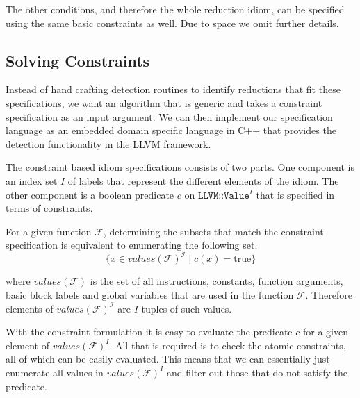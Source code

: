 The other conditions, and therefore the whole reduction idiom, can be specified using the same basic constraints as well.
Due to space we omit further details.


\subsection{Solving Constraints}
Instead of hand crafting detection routines to identify reductions 
 that fit these specifications, we want an algorithm
that is generic and takes a constraint specification as an input
argument.  We can then implement our specification language as an
embedded domain specific language in C++ that provides the detection
functionality in the LLVM framework. %

The constraint based idiom specifications 
consists of two parts.  One component is an index set
$I$ of labels that represent the different elements of the idiom.  The
other component is a boolean predicate $c$ on $\texttt{LLVM::Value}^I$
that is specified in terms of constraints.


For a given function $\mathcal F$,  determining the subsets that match the constraint specification
is  equivalent to enumerating the following set.
\begin{equation*}
\{x\in values(\mathcal F)^\mathcal I\mid c(x)=\text{true}\}
\end{equation*}

where $values(\mathcal F)$ is the set of all instructions,
constants, function arguments, basic block labels and global variables
that are used in the function $\mathcal F$.  Therefore elements of
$values(\mathcal F)^\mathcal I$ are $I$-tuples of such values.

With the constraint formulation it is easy to evaluate the predicate $c$ for a given element of $values(\mathcal F)^I$.
All that is required is to check the atomic constraints, all of which can be 
easily evaluated.
This means that we can essentially just enumerate all values in $values(\mathcal F)^I$ and filter out those that do not satisfy the predicate.

